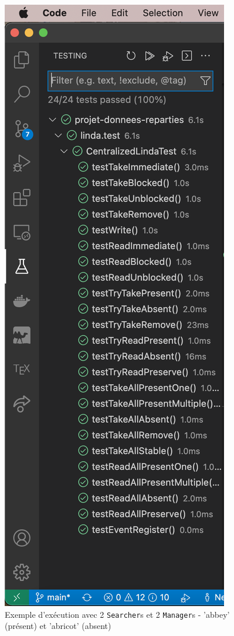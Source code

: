 \documentclass[headings=standardclasses,parskip=half]{scrartcl}
\begin{document}
\begin{figure}[h]
    \centering
    \includegraphics[scale=0.5]{tests-results.png}
    \caption{Exemple d'exécution avec 2 \texttt{Searcher}s 
    et 2 \texttt{Manager}s - 'abbey' (présent) et 'abricot' (absent)}
\end{figure}
\end{document}
